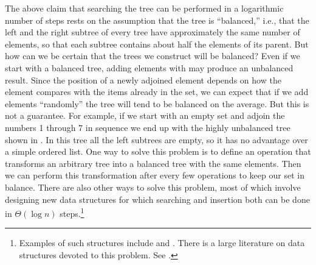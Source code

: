 \noindent
The above claim that searching the tree can be performed in a logarithmic
number of steps rests on the assumption that the tree is ``balanced,'' i.e.,
that the left and the right subtree of every tree have approximately the same
number of elements, so that each subtree contains about half the elements of
its parent.  But how can we be certain that the trees we construct will be
balanced?  Even if we start with a balanced tree, adding elements with
 may produce an unbalanced result.  Since the position of a
newly adjoined element depends on how the element compares with the items
already in the set, we can expect that if we add elements ``randomly'' the tree
will tend to be balanced on the average.  But this is not a guarantee.  For
example, if we start with an empty set and adjoin the numbers 1 through 7 in
sequence we end up with the highly unbalanced tree shown in .
In this tree all the left subtrees are empty, so it has no advantage over a
simple ordered list.  One way to solve this problem is to define an operation
that transforms an arbitrary tree into a balanced tree with the same elements.
Then we can perform this transformation after every few 
operations to keep our set in balance.  There are also other ways to solve this
problem, most of which involve designing new data structures for which
searching and insertion both can be done in \( \Theta(\log n) \)
steps.\footnote{Examples of such structures include  and
.  There is a large literature on data structures
devoted to this problem.  See .}

